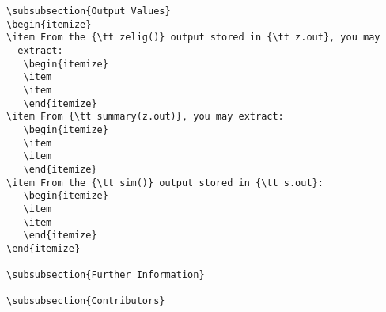 \begin{itemize}
\begin{verbatim}
\subsubsection{Output Values}
\begin{itemize}
\item From the {\tt zelig()} output stored in {\tt z.out}, you may
  extract:
   \begin{itemize}
   \item 
   \item 
   \end{itemize}
\item From {\tt summary(z.out)}, you may extract: 
   \begin{itemize}
   \item 
   \item 
   \end{itemize}
\item From the {\tt sim()} output stored in {\tt s.out}:
   \begin{itemize}
   \item 
   \item 
   \end{itemize}
\end{itemize}

\subsubsection{Further Information}

\subsubsection{Contributors}
\end{verbatim}
\end{itemize} 



